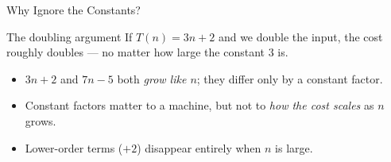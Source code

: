 \documentclass[aspectratio=169]{beamer}
\begin{document}

\begin{frame}{Why Ignore the Constants?}
  \begin{block}{The doubling argument}
    If $T(n) = 3n + 2$ and we double the input, the cost roughly doubles ---
    no matter how large the constant $3$ is.
  \end{block}
  \begin{itemize}
    \item $3n + 2$ and $7n - 5$ both \emph{grow like $n$}; they differ only by
      a constant factor.
    \item Constant factors matter to a machine, but not to \emph{how the cost
      scales} as $n$ grows.
    \item Lower-order terms ($+2$) disappear entirely when $n$ is large.
  \end{itemize}
\end{frame}
\end{document}
